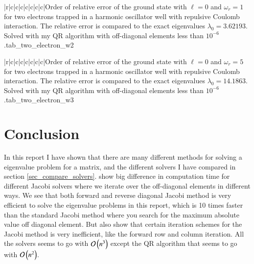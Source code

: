\documentclass[11pt,english,a4paper]{article}
\begin{document}
\begin{flushleft}
\begin{tabell}{|r|c|c|c|c|c|c|c|}{\small}{}{}{Order of relative error of the ground state with $\ell = 0$ and $\omega_r = 1$ for two electrons trapped in a harmonic oscillator well with repulsive Coulomb interaction. The relative error is compared to the exact eigenvalues  $\lambda_0 = 3.62193$. Solved with my QR algorithm with off-diagonal elements less than $10^{-6}$.}{tab_two_electron_w2}
\end{tabell}

\begin{tabell}{|r|c|c|c|c|c|c|c|}{\small}{}{}{Order of relative error of the ground state with $\ell = 0$ and $\omega_r = 5$ for two electrons trapped in a harmonic oscillator well with repulsive Coulomb interaction. The relative error is compared to the exact eigenvalues  $\lambda_0 = 14.1863$. Solved with my QR algorithm with off-diagonal elements less than $10^{-6}$.}{tab_two_electron_w3}
\end{tabell}




\newpage

\section{Conclusion}

In this report I have shown that there are many different methods for solving a eigenvalue problem for a matrix, and the different solvers I have compared in section \ref{sec_compare_solvers}.  show big difference in computation time for different Jacobi solvers where we iterate over the off-diagonal elements in different ways. We see that both forward and reverse diagonal Jacobi method is very efficient to solve the eigenvalue problems in this report, which is 10 times faster than the standard Jacobi method where you search for the maximum absolute value off diagonal element. But  also show that certain iteration schemes for the Jacobi method is very inefficient, like the forward row and column iteration. All the solvers seems to go with $\mathcal{O}\left({n^3}\right)$ except the QR algorithm that seems to go with $\mathcal{O}\left({n^2}\right)$. \linebreak


\end{flushleft}
\end{document}
